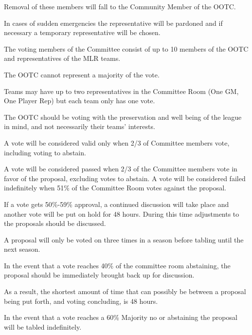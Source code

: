 \begin{deepEnumerate}
\begin{deepEnumerate}
\begin{deepEnumerate}
            \begin{deepEnumerate}
                \item Removal of these members will fall to the Community Member of the OOTC.
            \end{deepEnumerate}
            \item In cases of sudden emergencies the representative will be pardoned and if necessary a temporary representative will be chosen.
        \end{deepEnumerate}
    \end{deepEnumerate}
    \item The voting members of the Committee consist of up to 10 members of the OOTC and representatives of the MLR teams.
    \begin{deepEnumerate}
        \item The OOTC cannot represent a majority of the vote.
        \item Teams may have up to two representatives in the Committee Room (One GM, One Player Rep) but each team only has one vote.
        \item The OOTC should be voting with the preservation and well being of the league in mind, and not necessarily their teams' interests.
        \item A vote will be considered valid only when 2/3 of Committee members vote, including voting to abstain. 
        \item A vote will be considered passed when 2/3 of the Committee members vote in favor of the proposal, excluding votes to abstain.
        A vote will be considered failed indefinitely when 51\% of the Committee Room votes against the proposal.
        \item If a vote gets 50\%-59\% approval, a continued discussion will take place and another vote will be put on hold for 48 hours.
        During this time adjustments to the proposals should be discussed.
        \item A proposal will only be voted on three times in a season before tabling until the next season.
        \item In the event that a vote reaches 40\% of the committee room abstaining, the proposal should be immediately brought back up for discussion.
    \end{deepEnumerate}
    \item As a result, the shortest amount of time that can possibly be between a proposal being put forth, and voting concluding, is 48 hours.
    \item In the event that a vote reaches a 60\% Majority no or abstaining the proposal will be tabled indefinitely.

\end{deepEnumerate}
